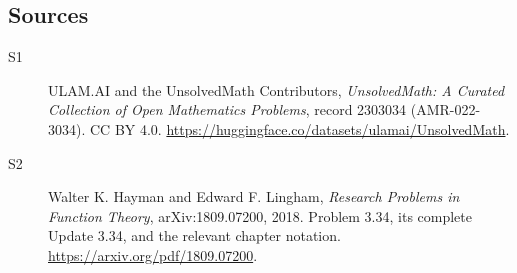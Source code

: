 \documentclass[11pt]{book}
\begin{document}
\subsection{Sources}
\begin{description}
\item[\hypertarget{source:2303034:1}{S1}] ULAM.AI and the UnsolvedMath Contributors, \emph{UnsolvedMath: A Curated Collection of Open Mathematics Problems}, record 2303034 (AMR-022-3034). CC BY 4.0. \url{https://huggingface.co/datasets/ulamai/UnsolvedMath}.
\item[\hypertarget{source:2303034:2}{S2}] Walter K. Hayman and Edward F. Lingham, \emph{Research Problems in Function Theory}, arXiv:1809.07200, 2018. Problem 3.34, its complete Update 3.34, and the relevant chapter notation. \url{https://arxiv.org/pdf/1809.07200}.
\end{description}
\label{end:2303034}
\end{document}
